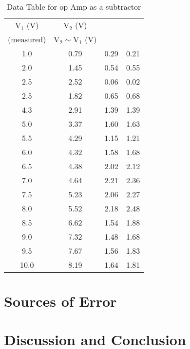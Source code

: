 \documentclass{scrartcl}
\begin{document}
    \begin{table}[H]
        \centering
        \begin{tabular}{|c|c|c|c|}
        \hline
        $\mathrm{V_1}$ (\si{V}) & $\mathrm{V_2}$ (\si{V}) & \thead{$\mathrm{V_{\text{out}}}\si{(V)}$\\ (measured)} & $\mathrm{V_2} \sim \mathrm{V_1}$ (\si{V}) \\ \hline
        1.0    & 0.79 & 0.29 & 0.21 \\ \hline
        2.0    & 1.45 & 0.54 & 0.55 \\ \hline
        2.5  & 2.52 & 0.06 & 0.02 \\ \hline
        2.5  & 1.82 & 0.65 & 0.68 \\ \hline
        4.3  & 2.91 & 1.39 & 1.39 \\ \hline
        5.0    & 3.37 & 1.60  & 1.63 \\ \hline
        5.5  & 4.29 & 1.15 & 1.21 \\ \hline
        6.0   & 4.32 & 1.58 & 1.68 \\ \hline
        6.5  & 4.38 & 2.02 & 2.12 \\ \hline
        7.0    & 4.64 & 2.21 & 2.36 \\ \hline
        7.5  & 5.23 & 2.06 & 2.27 \\ \hline
        8.0    & 5.52 & 2.18 & 2.48 \\ \hline
        8.5  & 6.62 & 1.54 & 1.88 \\ \hline
        9.0   & 7.32 & 1.48 & 1.68 \\ \hline
        9.5  & 7.67 & 1.56 & 1.83 \\ \hline
        10.0   & 8.19 & 1.64 & 1.81 \\ \hline
        \end{tabular}
        \caption{Data Table for op-Amp as a subtractor}
        \label{tab:voltage_measurements_diff}
        \end{table}




\section{Sources of Error}
\section{Discussion and Conclusion} 
\end{document}

